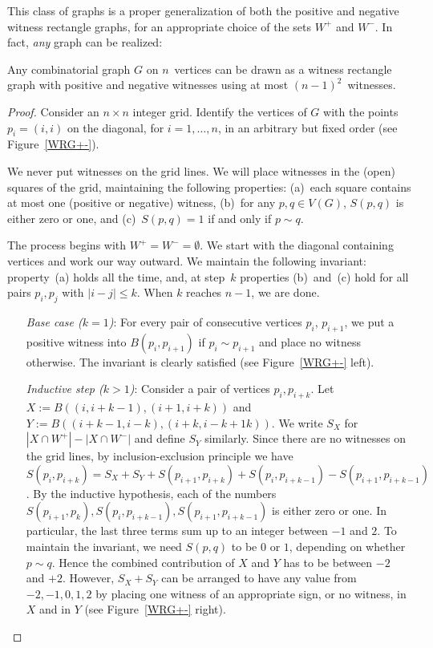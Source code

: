 \documentclass{llncs}
\begin{document}
This class of graphs is a proper generalization of both the positive 
and negative witness rectangle graphs, for an appropriate
choice of the sets $W^+$ and $W^-$.  
In fact, \emph{any} graph can be realized:


\begin{theorem}
  Any combinatorial graph $G$ on $n$~vertices can be drawn as a witness
  rectangle graph with positive and negative witnesses using at most
  $(n-1)^2$~witnesses.
\end{theorem}

\begin{proof}
  Consider an $n \times n$ integer grid.  Identify the vertices of $G$
  with the points $p_i=(i,i)$ on the diagonal, for $i=1, \ldots, n$,
  in an arbitrary but fixed order (see Figure~\ref{WRG+-}).

  We never put witnesses on the grid lines.  We will place witnesses
  in the (open) squares of the grid, maintaining the following
  properties: (a)~each square contains at most one (positive or negative) witness, (b)~for
  any $p,q \in V(G)$, $S(p,q)$ is either zero or one, and
  (c)~$S(p,q)=1$ if and only if $p \sim q$.

  The process begins with $W^+=W^-=\emptyset$.  We start with the
  diagonal containing vertices and work our way outward.  We maintain
  the following invariant: property~(a) holds all the time, and, at
  step~$k$ properties (b)~and~(c) hold for all pairs $p_i,p_j$ with
  $|i-j|\leq k$.  When $k$ reaches $n-1$, we are done.

  \begin{itemize}
  \item[\emph{Base case ($k=1$)}:] For every pair of consecutive
    vertices $p_i$, $p_{i+1}$, we put a positive witness into
    $B(p_i,p_{i+1})$ if $p_i\sim p_{i+1}$ and place no witness
    otherwise.  The invariant is clearly satisfied (see Figure~\ref{WRG+-} left).
  \item[\emph{Inductive step ($k>1$)}:] Consider a pair of vertices
    $p_i,p_{i+k}$.  Let $X:=B((i,i+k-1),(i+1,i+k))$ 
    and $Y:=B((i+k-1,i-k),(i+k,i-k+1k))$.  We write $S_X$
    for $|X \cap W^+| - |X \cap W^-|$ and define $S_Y$ similarly.
    Since there are no witnesses on the grid lines, by
    inclusion-exclusion principle we have $S(p_i,p_{i+k})=S_X + S_Y +
    S(p_{i+1},p_{i+k})+ S(p_i,p_{i+k-1}) - S(p_{i+1},p_{i+k-1})$.  By
    the inductive hypothesis, each of the numbers $S(p_{i+1},p_k),
    S(p_i,p_{i+k-1}), S(p_{i+1},p_{i+k-1})$ is either zero or one.  In
    particular, the last three terms sum up to an integer between $-1$
    and $2$.  To maintain the invariant, we need $S(p,q)$ to be $0$ or
    $1$, depending on whether $p \sim q$.  Hence the combined
    contribution of $X$ and $Y$ has to be between $-2$ and $+2$.
    However, $S_X+S_Y$ can be arranged to have any value from
    $-2,-1,0,1,2$ by placing one witness of an appropriate sign, or no
    witness, in $X$ and in $Y$ (see Figure~\ref{WRG+-} right).


\end{itemize}
\end{proof}
\end{document}

